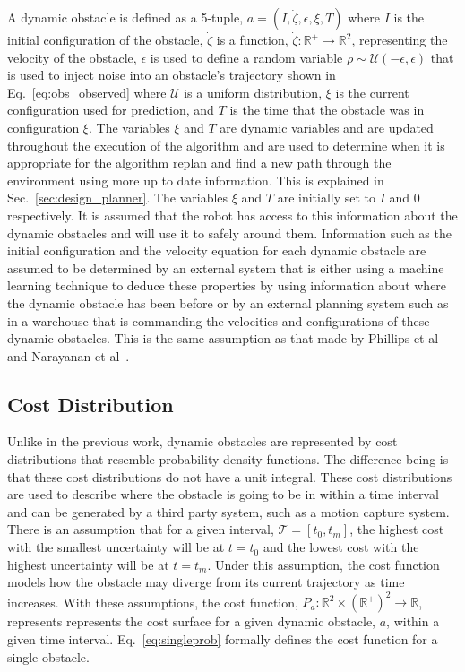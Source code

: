 A dynamic obstacle is defined as a 5-tuple, $a = (I, \dot{\zeta},
\epsilon, \xi, T)$ where $I$ is the initial configuration of the obstacle,
$\dot{\zeta}$ is a function, $\dot{\zeta}: \mathbb{R}^+ \rightarrow
\mathbb{R}^2$, representing the velocity of the obstacle, $\epsilon$ is used to
define a random variable $\rho \sim \mathcal{U}(-\epsilon, \epsilon)$ that is
used to inject noise into an obstacle's trajectory shown in
Eq.~\ref{eq:obs_observed} where $\mathcal{U}$ is a uniform distribution, $\xi$
is the current configuration used for prediction, and $T$ is the time that the
obstacle was in configuration $\xi$.  The variables $\xi$ and $T$ are dynamic
variables and are updated throughout the execution of the algorithm and are
used to determine when it is appropriate for the algorithm replan and find a
new path through the environment using more up to date information. This is
explained in Sec.~\ref{sec:design_planner}. The variables $\xi$ and $T$ are
initially set to $I$ and $0$ respectively. It is assumed that the robot has
access to this information about the dynamic obstacles and will use it to
safely around them.  Information such as the initial configuration and the
velocity equation for each dynamic obstacle are assumed to be determined by an
external system that is either using a machine learning technique to deduce
these properties by using information about where the dynamic obstacle has been
before or by an external planning system such as in a warehouse that is
commanding the velocities and configurations of these dynamic obstacles. This
is the same assumption as that made by Phillips et al~\cite{sipp} and Narayanan
et al~\cite{asipp}.

\subsection{Cost Distribution}

\label{sec:cost}

Unlike in the previous work, dynamic obstacles are represented by cost
distributions that resemble probability density functions. The difference being
is that these cost distributions do not have a unit integral. These cost
distributions are used to describe where the obstacle is going to be in within
a time interval and can be generated by a third party system, such as a motion
capture system. There is an assumption that for a given interval, $\mathcal{T}
= [t_0, t_m]$, the highest cost with the smallest uncertainty will be at $t =
t_0$ and the lowest cost with the highest uncertainty will be at $t = t_m$.
Under this assumption, the cost function models how the obstacle may diverge
from its current trajectory as time increases. With these assumptions, the cost
function, $P_a: \mathbb{R}^2 \times (\mathbb{R}^+)^2 \rightarrow
\mathbb{R}$, represents represents the cost surface for a given dynamic
obstacle, $a$,  within a given time interval. Eq.~\ref{eq:singleprob} formally
defines the cost function for a single obstacle.

